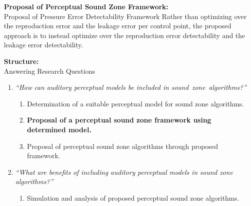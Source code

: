 \documentclass[aspectratio=169]{beamer}
\begin{document}
\begin{frame}{\textbf{Proposal of Perceptual Sound Zone Framework:}\\ Proposal of Pressure Error Detectability Framework}
    Rather than optimizing over the reproduction error and the leakage error per control point, 
    the proposed approach is to instead optimize over the reproduction error detectability and the leakage error detectability.
\end{frame}

\begin{frame}{\textbf{Structure:}\\ Answering Research Questions}
    \begin{enumerate}
        \item {\textit{``How can auditory perceptual models be included in sound~zone~algorithms?''}}
            \vspace{7pt}
            \begin{enumerate}
                \item Determination of a suitable perceptual model for sound zone algorithms.
                \vspace{7pt}
                \item \textbf{Proposal of a perceptual sound zone framework using determined model.}
                \vspace{7pt}
                \item Proposal of perceptual sound zone algorithms through proposed framework.
                \vspace{7pt}
            \end{enumerate}
        \item {\textit{``What are benefits of including auditory perceptual models in sound zone algorithms?''}}
            \vspace{-5pt}
            \begin{enumerate}
                \item Simulation and analysis of proposed perceptual sound zone algorithms.
            \end{enumerate}
    \end{enumerate}
\end{frame}
\end{document}
